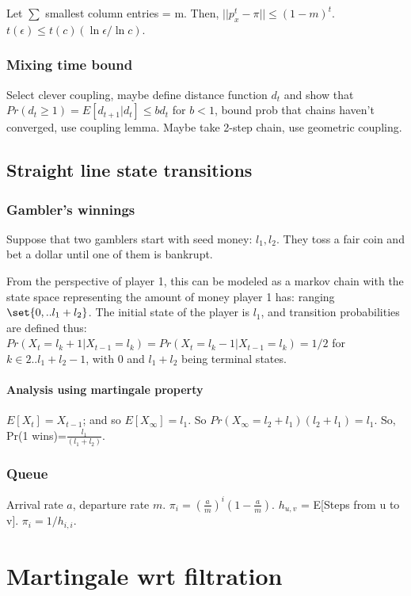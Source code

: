 \documentclass[oneside, article]{memoir}
\begin{document}
Let $\sum$ smallest column entries = m. Then, $||p_{x}^{t}-\pi|| \leq (1-m)^{t}$. $t(\epsilon)\leq t(c)(\ln \epsilon/\ln c)$.

\subsubsection{Mixing time bound}
Select clever coupling, maybe define distance function $d_{t}$ and show that $Pr(d_{t} \geq 1) = E[d_{t+1}|d_{t}] \leq b d_{t}$ for $b<1$, bound prob that chains haven't converged, use coupling lemma. Maybe take 2-step chain, use geometric coupling. 

\subsection{Straight line state transitions}
\subsubsection{Gambler's winnings}
Suppose that two gamblers start with seed money: $l_{1}, l_{2}$. They toss a fair coin and bet a dollar until one of them is bankrupt.

From the perspective of player 1, this can be modeled as a markov chain with the state space representing the amount of money player 1 has: ranging $\set{0, .. l_1 + l_2}$. The initial state of the player is $l_1$, and transition probabilities are defined thus: $Pr(X_t = l_k +1 |X_{t-1}= l_k) = Pr(X_{t}= l_k -1 |X_{t-1}= l_k) = 1/2$ for $k \in {2 .. l_1 + l_2 -1}$, with $0$ and $l_1 + l_2$ being terminal states.

\paragraph{Analysis using martingale property}
$E[X_t]=X_{t-1}$; and so $E[X_{\infty}] = l_1$. So $Pr(X_{\infty} = l_2 + l_1) (l_2 + l_1) = l_1$. So, Pr(1 wins)=$\frac{l_{1}}{(l_{1}+l_{2})}$.

\subsubsection{Queue}
Arrival rate $a$, departure rate $m$. $\pi_{i}=(\frac{a}{m})^{i}(1-\frac{a}{m})$. $h_{u,v}$ = E[Steps from u to v]. $\pi_{i} = 1/h_{i,i}$.

\section{Martingale  wrt filtration}
\end{document}

